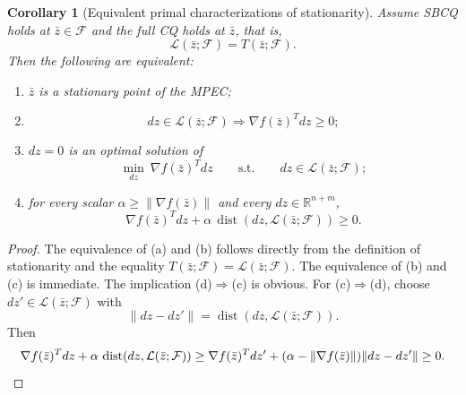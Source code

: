 \documentclass[10pt,a4paper]{amsart}
\newtheorem{corollary}{Corollary}
\newcommand{\Fcal}{\mathcal{F}}
\newcommand{\Lcal}{\mathcal{L}}
\newcommand{\R}{\mathbb{R}}
\newcommand{\dist}{\operatorname{dist}}
\begin{document}
\begin{corollary}[Equivalent primal characterizations of stationarity]
\label{cor:331}
Assume SBCQ holds at $\bar z\in\Fcal$ and the full CQ holds at $\bar z$,
that is,
\[
\Lcal(\bar z;\Fcal)=T(\bar z;\Fcal).
\]
Then the following are equivalent:
\begin{enumerate}[label=\textnormal{(\alph*)}]
\item $\bar z$ is a stationary point of the MPEC;
\item
\[
dz\in \Lcal(\bar z;\Fcal)\Longrightarrow \nabla f(\bar z)^Tdz\ge 0;
\]
\item $dz=0$ is an optimal solution of
\[
\min_{dz}\ \nabla f(\bar z)^Tdz
\qquad\text{s.t.}\qquad dz\in \Lcal(\bar z;\Fcal);
\]
\item for every scalar $\alpha\ge \|\nabla f(\bar z)\|$ and every
$dz\in\R^{n+m}$,
\[
\nabla f(\bar z)^Tdz+\alpha\,\dist(dz,\Lcal(\bar z;\Fcal))\ge 0.
\]
\end{enumerate}
\end{corollary}

\begin{proof}
The equivalence of (a) and (b) follows directly from the definition of
stationarity and the equality $T(\bar z;\Fcal)=\Lcal(\bar z;\Fcal)$. The
equivalence of (b) and (c) is immediate. The implication (d)$\Rightarrow$(c)
is obvious. For (c)$\Rightarrow$(d), choose $dz'\in\Lcal(\bar z;\Fcal)$ with
\[
\|dz-dz'\|=\dist(dz,\Lcal(\bar z;\Fcal)).
\]
Then
\[
\nabla f(\bar z)^Tdz+\alpha\,\dist(dz,\Lcal(\bar z;\Fcal))
\ge
\nabla f(\bar z)^Tdz'+(\alpha-\|\nabla f(\bar z)\|)\|dz-dz'\|\ge 0.
\qedhere
\]
\end{proof}
\end{document}
